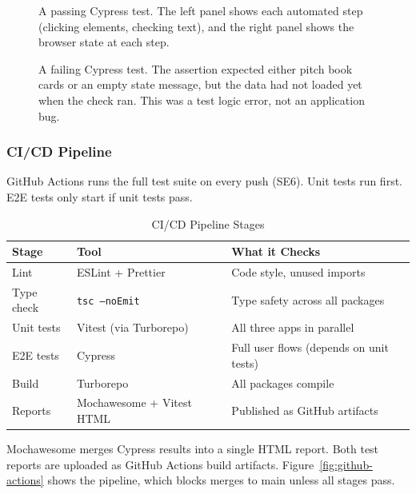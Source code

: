 \begin{figure}[H]
\centering
{}
\caption{A passing Cypress test. The left panel shows each automated step (clicking elements, checking text), and the right panel shows the browser state at each step.}
\label{fig:cypress-passed}
\end{figure}

\begin{figure}[H]
\centering
{}
\caption{A failing Cypress test. The assertion expected either pitch book cards or an empty state message, but the data had not loaded yet when the check ran. This was a test logic error, not an application bug.}
\label{fig:cypress-failed}
\end{figure}

\subsubsection{CI/CD Pipeline}

GitHub Actions runs the full test suite on every push (SE6). Unit tests run first. E2E tests only start if unit tests pass.

\begin{table}[H]
\centering
\begin{tabular}{|l|l|l|}
\hline
\rowcolor{gray!20} \textbf{Stage} & \textbf{Tool} & \textbf{What it Checks} \\
\hline
Lint & ESLint + Prettier & Code style, unused imports \\
\hline
Type check & \texttt{tsc --noEmit} & Type safety across all packages \\
\hline
Unit tests & Vitest (via Turborepo) & All three apps in parallel \\
\hline
E2E tests & Cypress & Full user flows (depends on unit tests) \\
\hline
Build & Turborepo & All packages compile \\
\hline
Reports & Mochawesome + Vitest HTML & Published as GitHub artifacts \\
\hline
\end{tabular}
\caption{CI/CD Pipeline Stages}
\label{tab:cicd}
\end{table}

Mochawesome \parencite{mochawesome2024} merges Cypress results into a single HTML report. Both test reports are uploaded as GitHub Actions build artifacts. Figure~\ref{fig:github-actions} shows the pipeline, which blocks merges to main unless all stages pass.

